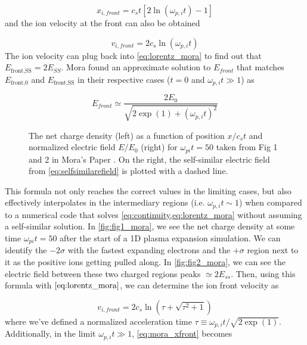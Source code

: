 \begin{equation}
	x_{i, front} = c_s t [2 \ln(\omega_{p,i} t) - 1] \label{eq:mora_xfront}
\end{equation} 
and the ion velocity at the front can also be obtained 

\begin{equation}
	v_{i, front} = 2 c_s \ln(\omega_{p,i} t)
\end{equation}
The ion velocity can plug back into \cref{eq:lorentz_mora} to find out that $E_\text{front,SS} = 2 E_{SS}$. Mora found an approximate solution to $E_{front}$ that matches $E_\text{front,0}$ and $E_\text{front,SS}$ in their respective cases ($t = 0$ and $\omega_{p,i} t \gg 1$) as 

\begin{equation}
	E_{front} \simeq \frac{2 E_0}{\sqrt{2 \exp(1) + (\omega_{p,i} t)^2}}
\end{equation}

\begin{figure}
	\centering 
	\caption{The net charge density (left) as a function of position $x / c_s t$ and normalized electric field $E/E_0$ (right) for $\omega_{pi} t = 50$ taken from Fig 1 and 2 in Mora's Paper \cite{Mora_2003_PRL}. On the right, the self-similar electric field from \cref{eq:selfsimilarefield} is plotted with a dashed line.}
\end{figure}
This formula not only reaches the correct values in the limiting cases, but also effectively interpolates in the intermediary regions (i.e. $\omega_{p,i} t \sim 1$) when compared to a numerical code that solves \cref{eq:continuity,eq:lorentz_mora} without assuming a self-similar solution. In \cref{fig:fig1_mora}, we see the net charge density at some time $\omega_{pi} t = 50$ after the start of a 1D plasma expansion simulation. We can identify the $-2\sigma$ with the fastest expanding electrons and the $+\sigma$ region next to it as the positive ions getting pulled along. In \cref{fig:fig2_mora}, we can see the electric field between these two charged regions peaks $\simeq 2 E_{ss}$. Then, using this formula with $\cref{eq:lorentz_mora}$, we can determine the ion front velocity as 

\begin{equation}
	v_{i,front} = 2 c_s \ln(\tau + \sqrt{\tau^2 + 1})	
\end{equation}
where we've defined a normalized acceleration time $\tau \equiv \omega_{p,i} t / \sqrt{2 \exp(1)}$. Additionally, in the limit $\omega_{p,i} t \gg 1$, \cref{eq:mora_xfront} becomes

